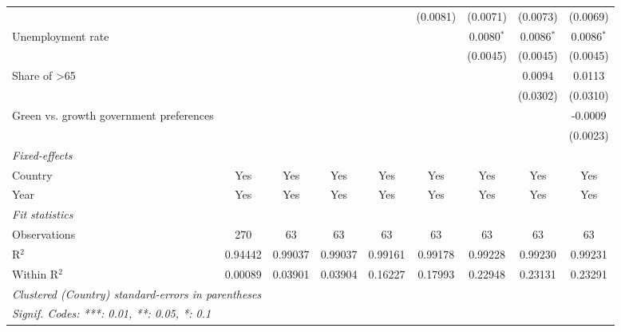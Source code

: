 \begin{table}[htbp]
\begin{tabular}{lcccccccc}
                                                                               &          &          &          &              & (0.0081)     & (0.0071)     & (0.0073)     & (0.0069)\\   
      Unemployment rate                                                        &          &          &          &              &              & 0.0080$^{*}$ & 0.0086$^{*}$ & 0.0086$^{*}$\\   
                                                                               &          &          &          &              &              & (0.0045)     & (0.0045)     & (0.0045)\\   
      Share of >65                                                             &          &          &          &              &              &              & 0.0094       & 0.0113\\   
                                                                               &          &          &          &              &              &              & (0.0302)     & (0.0310)\\   
      Green vs. growth government preferences                                  &          &          &          &              &              &              &              & -0.0009\\   
                                                                               &          &          &          &              &              &              &              & (0.0023)\\   
      \midrule
      \emph{Fixed-effects}\\
      Country                                                                  & Yes      & Yes      & Yes      & Yes          & Yes          & Yes          & Yes          & Yes\\  
      Year                                                                     & Yes      & Yes      & Yes      & Yes          & Yes          & Yes          & Yes          & Yes\\  
      \midrule
      \emph{Fit statistics}\\
      Observations                                                             & 270      & 63       & 63       & 63           & 63           & 63           & 63           & 63\\  
      R$^2$                                                                    & 0.94442  & 0.99037  & 0.99037  & 0.99161      & 0.99178      & 0.99228      & 0.99230      & 0.99231\\  
      Within R$^2$                                                             & 0.00089  & 0.03901  & 0.03904  & 0.16227      & 0.17993      & 0.22948      & 0.23131      & 0.23291\\  
      \midrule \midrule
      \multicolumn{9}{l}{\emph{Clustered (Country) standard-errors in parentheses}}\\
      \multicolumn{9}{l}{\emph{Signif. Codes: ***: 0.01, **: 0.05, *: 0.1}}\\
   \end{tabular}
\end{table}


